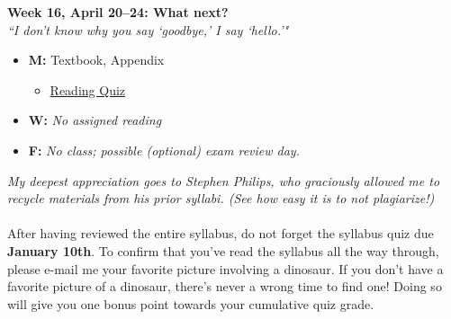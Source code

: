 \documentclass[11pt]{article}
\begin{document}
\textbf{Week 16, April 20--24: What next?}
\\
\textit{``I don't know why you say `goodbye,' I say `hello.'"}

\begin{itemize}
\item \textbf{M:} Textbook, Appendix
\begin{itemize}
\item\underline{Reading Quiz}
\end{itemize}
\item \textbf{W:} \textit{No assigned reading}
\item \textbf{F:} \textit{No class; possible (optional) exam review day.}
\end{itemize}


\textit{My deepest appreciation goes to Stephen Philips, who graciously allowed me to recycle materials from his prior syllabi. (See how easy it is to not plagiarize!)}
\\\\
After having reviewed the entire syllabus, do not forget the syllabus quiz due \textbf{January 10th}. To confirm that you’ve read the syllabus all the way through, please e-mail me your favorite picture involving a dinosaur. If you don’t have a favorite picture of a dinosaur, there’s never a wrong time to find one! Doing so will give you one bonus point towards your cumulative quiz grade. 
\end{document}
